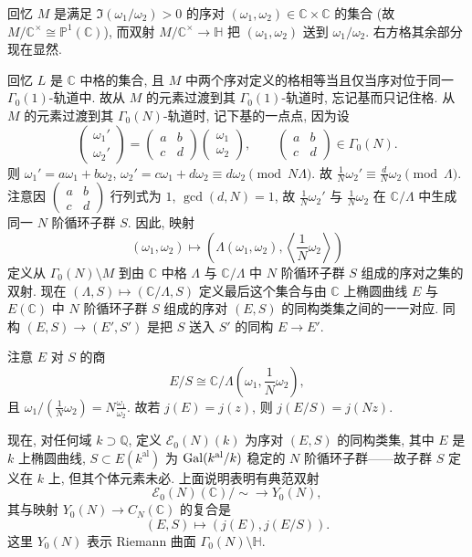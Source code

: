回忆 $M$ 是满足 $\Im(\omega_1/\omega_2) > 0$ 的序对 $(\omega_1, \omega_2)\in\mathbb{C}\times\mathbb{C}$ 的集合 (故 $M/\mathbb{C}^{\times}\cong\mathbb{P}^1(\mathbb{C})$), 而双射 $M/\mathbb{C}^{\times}\to\mathbb{H}$ 把 $(\omega_1, \omega_2)$ 送到 $\omega_1/\omega_2$. 右方格其余部分现在显然.

回忆 $L$ 是 $\mathbb{C}$ 中格的集合, 且 $M$ 中两个序对定义的格相等当且仅当序对位于同一 $\Gamma_0(1)$-轨道中. 故从 $M$ 的元素过渡到其 $\Gamma_0(1)$-轨道时, 忘记基而只记住格. 从 $M$ 的元素过渡到其 $\Gamma_0(N)$-轨道时, 记下基的一点点, 因为设
\[
\begin{pmatrix}\omega_1'\\ \omega_2'\end{pmatrix} = \begin{pmatrix}a & b\\ c & d\end{pmatrix}\begin{pmatrix}\omega_1\\ \omega_2\end{pmatrix}, \qquad \begin{pmatrix}a & b\\ c & d\end{pmatrix}\in\Gamma_0(N).
\]
则 $\omega_1' = a\omega_1 + b\omega_2$, $\omega_2' = c\omega_1 + d\omega_2\equiv d\omega_2\pmod{N\Lambda}$. 故 $\frac{1}{N}\omega_2'\equiv\frac{d}{N}\omega_2\pmod{\Lambda}$. 注意因 $\begin{pmatrix}a & b\\ c & d\end{pmatrix}$ 行列式为 $1$, $\gcd(d, N) = 1$, 故 $\frac{1}{N}\omega_2'$ 与 $\frac{1}{N}\omega_2$ 在 $\mathbb{C}/\Lambda$ 中生成同一 $N$ 阶循环子群 $S$. 因此, 映射
\[
(\omega_1, \omega_2)\mapsto\left(\Lambda(\omega_1, \omega_2), \left\langle\frac{1}{N}\omega_2\right\rangle\right)
\]
定义从 $\Gamma_0(N)\setminus M$ 到由 $\mathbb{C}$ 中格 $\Lambda$ 与 $\mathbb{C}/\Lambda$ 中 $N$ 阶循环子群 $S$ 组成的序对之集的双射. 现在 $(\Lambda, S)\mapsto(\mathbb{C}/\Lambda, S)$ 定义最后这个集合与由 $\mathbb{C}$ 上椭圆曲线 $E$ 与 $E(\mathbb{C})$ 中 $N$ 阶循环子群 $S$ 组成的序对 $(E, S)$ 的同构类集之间的一一对应. 同构 $(E, S)\to(E', S')$ 是把 $S$ 送入 $S'$ 的同构 $E\to E'$.

注意 $E$ 对 $S$ 的商
\[
E/S\cong\mathbb{C}/\Lambda(\omega_1, \frac{1}{N}\omega_2),
\]
且 $\omega_1/(\frac{1}{N}\omega_2) = N\frac{\omega_1}{\omega_2}$. 故若 $j(E) = j(z)$, 则 $j(E/S) = j(Nz)$.

现在, 对任何域 $k\supset\mathbb{Q}$, 定义 $\mathcal{E}_0(N)(k)$ 为序对 $(E,S)$ 的同构类集, 其中 $E$ 是 $k$ 上椭圆曲线, $S\subset E(k^{\mathrm{al}})$ 为 $\operatorname{Gal}(k^{\mathrm{al}}/k)$ 稳定的 $N$ 阶循环子群——故子群 $S$ 定义在 $k$ 上, 但其个体元素未必. 上面说明表明有典范双射
\[
\mathcal{E}_0(N)(\mathbb{C})/{\sim}\to Y_0(N),
\]
其与映射 $Y_0(N)\to C_N(\mathbb{C})$ 的复合是
\[
(E, S)\mapsto(j(E), j(E/S)).
\]
这里 $Y_0(N)$ 表示 Riemann 曲面 $\Gamma_0(N)\setminus\mathbb{H}$.

